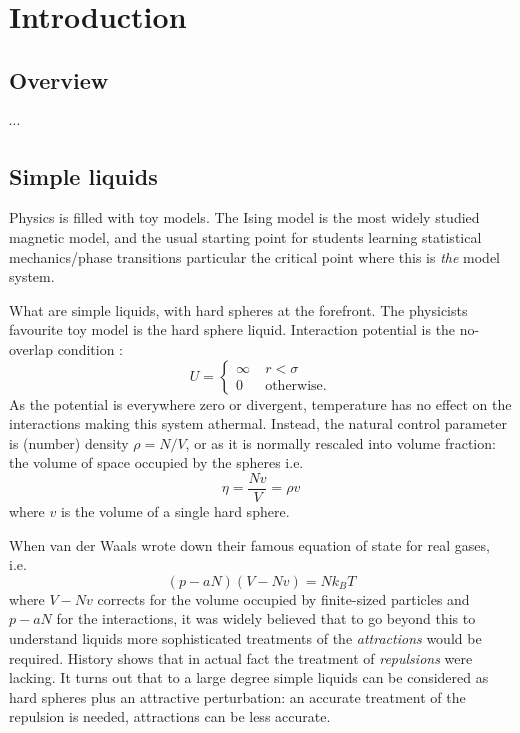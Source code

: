 \documentclass[11pt]{report}
\begin{document}
\chapter{Introduction}

\section{Overview}

$\cdots$


\section{Simple liquids}

Physics is filled with toy models.
The Ising model is the most widely studied magnetic model, and the usual starting point for students learning statistical mechanics/phase transitions particular the critical point where this is \emph{the} model system.

What are simple liquids, with hard spheres at the forefront.
The physicists favourite toy model is the hard sphere liquid.
Interaction potential is the no-overlap condition%
:
\begin{equation}
  U =
  \begin{cases}
    \infty & \; r < \sigma \\
    0 & \; \textrm{otherwise}.
  \end{cases}
\end{equation}
As the potential is everywhere zero or divergent, temperature has no effect on the interactions making this system athermal.
Instead, the natural control parameter is (number) density $\rho = N/V$, or as it is normally rescaled into volume fraction: the volume of space occupied by the spheres i.e.\
\begin{equation}
  \eta = \frac{N v}{V} = \rho v
\end{equation}
where $v$ is the volume of a single hard sphere.

When van der Waals wrote down their famous equation of state for real gases, i.e.\
\begin{equation}
  (p - a N)(V - Nv) = N k_B T
\end{equation}
where $V - Nv$ corrects for the volume occupied by finite-sized particles and $p - aN$ for the interactions,
it was widely believed that to go beyond this to understand liquids more sophisticated treatments of the \emph{attractions} would be required.
History shows that in actual fact the treatment of \emph{repulsions} were lacking.
It turns out that to a large degree simple liquids can be considered as hard spheres plus an attractive perturbation: an accurate treatment of the repulsion is needed, attractions can be less accurate.
\end{document}

